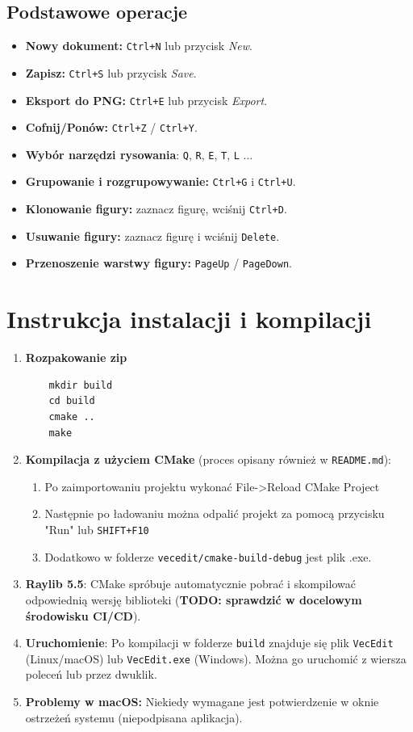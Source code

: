 \documentclass[a4paper,12pt]{article}
\begin{document}
\subsection{Podstawowe operacje}
\begin{itemize}
    \item \textbf{Nowy dokument:} \texttt{Ctrl+N} lub przycisk \emph{New}.
    \item \textbf{Zapisz:} \texttt{Ctrl+S} lub przycisk \emph{Save}.
    \item \textbf{Eksport do PNG:} \texttt{Ctrl+E} lub przycisk \emph{Export}.
    \item \textbf{Cofnij/Ponów:} \texttt{Ctrl+Z} / \texttt{Ctrl+Y}.
    \item \textbf{Wybór narzędzi rysowania}: \texttt{Q}, \texttt{R}, \texttt{E}, \texttt{T}, \texttt{L} ...
    \item \textbf{Grupowanie i rozgrupowywanie:} \texttt{Ctrl+G} i \texttt{Ctrl+U}.
    \item \textbf{Klonowanie figury:} zaznacz figurę, wciśnij \texttt{Ctrl+D}. 
    \item \textbf{Usuwanie figury:} zaznacz figurę i wciśnij \texttt{Delete}.
    \item \textbf{Przenoszenie warstwy figury:} \texttt{PageUp} / \texttt{PageDown}.
\end{itemize}


\section{Instrukcja instalacji i kompilacji}
\begin{enumerate}
    \item \textbf{Rozpakowanie zip}
    \begin{verbatim}
    mkdir build
    cd build
    cmake ..
    make
    \end{verbatim}
    \item \textbf{Kompilacja z użyciem CMake} (proces opisany również w \texttt{README.md}):
        \begin{enumerate}
            \item Po zaimportowaniu projektu wykonać File->Reload CMake Project
            \item Następnie po ładowaniu można odpalić projekt za pomocą 
                przycisku "Run" lub \texttt{SHIFT+F10}
            \item Dodatkowo w folderze \texttt{vecedit/cmake-build-debug} jest
                plik .exe.
        \end{enumerate}
    \item \textbf{Raylib 5.5}: CMake spróbuje automatycznie pobrać i
      skompilować odpowiednią wersję biblioteki (\textbf{TODO: sprawdzić w 
      docelowym środowisku CI/CD}).
    \item \textbf{Uruchomienie}: Po kompilacji w folderze \texttt{build} znajduje się 
    plik \texttt{VecEdit} (Linux/macOS) lub \texttt{VecEdit.exe} (Windows). 
    Można go uruchomić z wiersza poleceń lub przez dwuklik. 
    \item \textbf{Problemy w macOS:} Niekiedy wymagane jest potwierdzenie
    w oknie ostrzeżeń systemu (niepodpisana aplikacja).
\end{enumerate}
\end{document}

